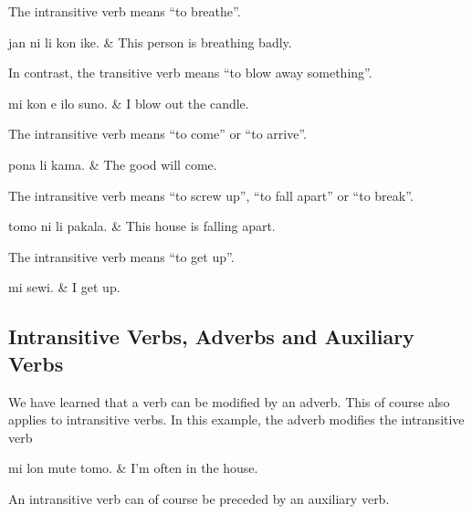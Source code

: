 %
The intransitive verb  means ``to breathe''.

\begin{translationtable}
    jan ni li kon ike. & This person is breathing badly. \\
\end{translationtable}
%
In contrast, the transitive verb  means ``to blow away something''.

\begin{translationtable}
    mi kon e ilo suno. & I blow out the candle. \\
\end{translationtable}
%
The intransitive verb  means ``to come'' or ``to arrive''.

\begin{translationtable}
    pona li kama. & The good will come. \\
\end{translationtable}
%
%
The intransitive verb  means ``to screw up'', ``to fall apart'' or ``to break''.

\begin{translationtable}
    tomo ni li pakala. & This house is falling apart. \\
\end{translationtable}
%
%
The intransitive verb  means ``to get up''.

\begin{translationtable}
    mi sewi. & I get up. \\
\end{translationtable}

\subsection*{Intransitive Verbs, Adverbs and Auxiliary Verbs}
We have learned that a verb can be modified by an adverb.
This of course also applies to intransitive verbs.
In this example, the adverb  modifies the intransitive verb 

\begin{translationtable}
    mi lon mute tomo. & I'm often in the house. \\
\end{translationtable}
%
An intransitive verb can of course be preceded by an auxiliary verb.

